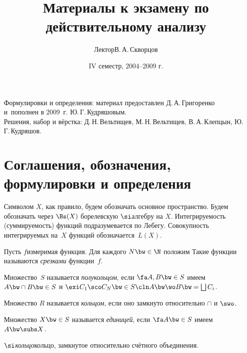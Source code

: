 \documentclass[a4paper]{article}
\title{Материалы к экзамену по действительному анализу}
\author{Лектор\т В.\,А.\,Скворцов}
\date{IV семестр, 2004--2009 г.}
\begin{document}
\maketitle
\begin{center}
  {\footnotesize
  Формулировки и определения: материал предоставлен Д.\,А.\,Григоренко
  и~пополнен в 2009~г. Ю.\,Г.\,Кудряшовым.\\
  Решения, набор и вёрстка: Д.\,Н.\,Вельтищев, М.\,Н.\,Вельтищев,
  В.\,А.\,Клепцын, Ю.\,Г.\,Кудряшов.\par}
\end{center}

\section{Соглашения, обозначения, формулировки и определения}

Символом $X$, как правило, будем обозначать основное пространство.
Будем обозначать через $\Bs(X)$ борелевскую $\si$\д алгебру на $X$.
Интегрируемость (суммируемость) функций подразумевается по Лебегу.
Совокупность интегрируемых на~$X$ функций обозначается~$L(X)$.

\begin{df}
  Пусть $f$\т измеримая функция. Для каждого $N \bw\in \N$ положим
  Такие функции называются \emph{срезками} функции~$f$.
\end{df}

\begin{df}
  Множество~$S$ называется \emph{полукольцом}, если $\fa A,B\bw\in S$ имеем $A\bw\cap B \bw\in S$ и
  $\exi C_1\sco C_N \bw\in S\cln A \bw\wo B \bw= \bigsqcup C_i$.
\end{df}

\begin{df}
  Множество $R$ называется \emph{кольцом}, если оно замкнуто относительно $\cap$ и $\swo$.
\end{df}

\begin{df}
  Множество $X \bw\in S$ называется \emph{единицей}, если $\fa A \bw\in S$ имеем $A \bw\subs X$.
\end{df}

\begin{df}
  \emph{$\si$\д кольцо}\т кольцо, замкнутое относительно счётного объединения.
\end{df}
\end{document}

